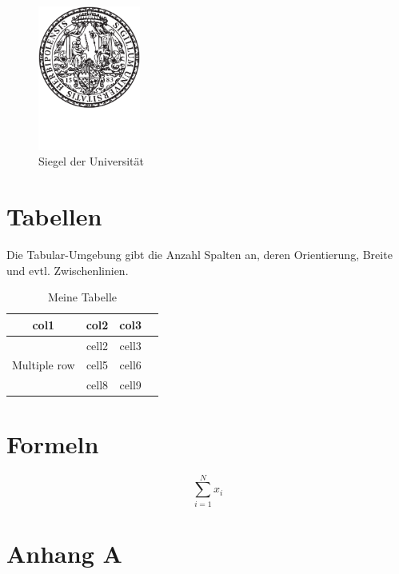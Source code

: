 \documentclass[12pt,oneside]{article}
\begin{document}
\begin{figure}[h]
    \centering
    \includegraphics[width=0.3\textwidth]{siegel.pdf}
    \caption{Siegel der Universität}
    \label{fig:my_label}
\end{figure}


\section{Tabellen}

Die Tabular-Umgebung gibt die Anzahl Spalten an, deren Orientierung, Breite und evtl. Zwischenlinien. 


\begin{table}[ht]
    \centering
    \caption{Meine Tabelle}
        \begin{tabular}{ cccc } 
        \toprule
        col1 & col2 & col3 \\
        \midrule
        \multirow{3}{4em}{Multiple row} & cell2 & cell3 \\ 
        & cell5 & cell6 \\ 
        & cell8 & cell9 \\ 
        \bottomrule
    \end{tabular}
    \label{tab:countries}
\end{table}

\section{Formeln}

\begin{equation}
    \sum_{i=1}^N x_i
    \label{eq:1}
\end{equation}



\clearpage
\lhead{}
\printbibliography
{}


\clearpage
\appendix
\section{Anhang A}


\end{document}
